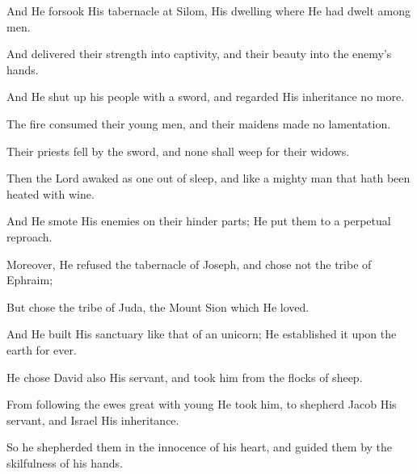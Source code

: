 And He forsook His tabernacle at Silom, His dwelling where He had dwelt among men.

And delivered their strength into captivity, and their beauty into the enemy’s hands.

And He shut up his people with a sword, and regarded His inheritance no more.

The fire consumed their young men, and their maidens made no lamentation.

Their priests fell by the sword, and none shall weep for their widows.

Then the Lord awaked as one out of sleep, and like a mighty man that hath been heated with wine.

And He smote His enemies on their hinder parts; He put them to a perpetual reproach.

Moreover, He refused the tabernacle of Joseph, and chose not the tribe of Ephraim;

But chose the tribe of Juda, the Mount Sion which He loved.

And He built His sanctuary like that of an unicorn; He established it upon the earth for ever.

He chose David also His servant, and took him from the flocks of sheep.

From following the ewes great with young He took him, to shepherd Jacob His servant, and Israel His inheritance.

So he shepherded them in the innocence of his heart, and guided them by the skilfulness of his hands.
